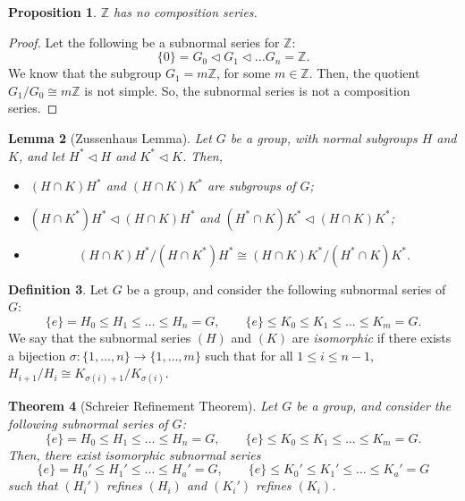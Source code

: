\documentclass[a4paper, openany]{memoir}
\theoremstyle{definition}
\newtheorem{definition}{Definition}[section]
\theoremstyle{plain}
\newtheorem{theorem}[definition]{Theorem}
\newtheorem{lemma}[definition]{Lemma}
\newtheorem{proposition}[definition]{Proposition}
\begin{document}
    \begin{proposition}
        $\mathbb{Z}$ has no composition series.
    \end{proposition}
    \begin{proof}
        Let the following be a subnormal series for $\mathbb{Z}$:
        \[\{0\} = G_0 \vartriangleleft G_1 \vartriangleleft \dots G_n = \mathbb{Z}.\]
        We know that the subgroup $G_1 = m\mathbb{Z}$, for some $m \in \mathbb{Z}$. Then, the quotient $G_1/G_0 \cong m\mathbb{Z}$ is not simple. So, the subnormal series is not a composition series.
    \end{proof}

    \begin{lemma}[Zussenhaus Lemma]
        Let $G$ be a group, with normal subgroups $H$ and $K$, and let $H^* \vartriangleleft H$ and $K^* \vartriangleleft K$. Then,
        \begin{itemize}
            \item $(H \cap K)H^*$ and $(H \cap K)K^*$ are subgroups of $G$;
            \item $(H \cap K^*)H^* \vartriangleleft (H \cap K)H^*$ and $(H^* \cap K)K^* \vartriangleleft (H \cap K)K^*$;
            \item \[ (H \cap K)H^* / (H \cap K^*)H^* \cong (H \cap K)K^* / (H^* \cap K)K^*.\]
        \end{itemize}
    \end{lemma}
    \begin{definition}
        Let $G$ be a group, and consider the following subnormal series of $G$:
        \[\{e\} = H_0 \leq H_1 \leq \dots \leq H_n = G, \qquad \{e\} \leq K_0 \leq K_1 \leq \dots \leq K_m = G.\]
        We say that the subnormal series $(H)$ and $(K)$ are \emph{isomorphic} if there exists a bijection $\sigma: \{1, \dots, n\} \to \{1, \dots, m\}$ such that for all $1 \leq i \leq n-1$, $H_{i+1}/H_i \cong K_{\sigma(i)+1}/K_{\sigma(i)}$.
    \end{definition}

    \begin{theorem}[Schreier Refinement Theorem]
        Let $G$ be a group, and consider the following subnormal series of $G$:
        \[\{e\} = H_0 \leq H_1 \leq \dots \leq H_n = G, \qquad \{e\} \leq K_0 \leq K_1 \leq \dots \leq K_m = G.\]
        Then, there exist isomorphic subnormal series
        \[\{e\} = H_0' \leq H_1' \leq \dots \leq H_a' = G, \qquad \{e\} \leq K_0' \leq K_1' \leq \dots \leq K_a' = G\]
        such that $(H_i')$ refines $(H_i)$ and $(K_i')$ refines $(K_i)$.        
    \end{theorem}
\end{document}
